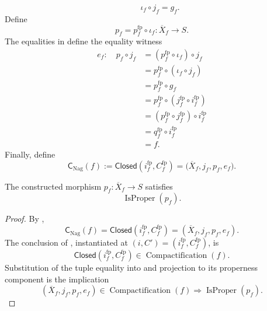 \begin{definition}
\[    \qquad
    \iota_f\circ j_f=g_f.
  \]
  Define
  \[
    p_f=p_f^{\mathrm{fp}}\circ\iota_f
      \colon\overline X_f\longrightarrow S.
  \]
  The equalities in
  define the equality witness
  \[
  \begin{aligned}
    e_f\colon\quad p_f\circ j_f
      &=(p_f^{\mathrm{fp}}\circ\iota_f)\circ j_f\\
      &=p_f^{\mathrm{fp}}\circ(\iota_f\circ j_f)\\
      &=p_f^{\mathrm{fp}}\circ g_f\\
      &=p_f^{\mathrm{fp}}\circ
        (j_f^{\mathrm{fp}}\circ i_f^{\mathrm{fp}})\\
      &=(p_f^{\mathrm{fp}}\circ j_f^{\mathrm{fp}})
        \circ i_f^{\mathrm{fp}}\\
      &=q_f^{\mathrm{fp}}\circ i_f^{\mathrm{fp}}\\
      &=f.
  \end{aligned}
  \]
  Finally, define
  \[
    \mathsf C_{\mathrm{Nag}}(f)
      :=\mathsf{Closed}(i_f^{\mathrm{fp}},C_f^{\mathrm{fp}})
      =\bigl(\overline X_f,j_f,p_f,e_f\bigr).
  \]
\end{definition}

\begin{lemma}
\checked
  \label{lemma:nagata-final-ambient-proper}
  \lean{}

  The constructed morphism $p_f\colon\overline X_f\to S$ satisfies
  \[
    \operatorname{IsProper}(p_f).
  \]
\end{lemma}

\begin{proof}
\checked
  By ,
  \[
    \mathsf C_{\mathrm{Nag}}(f)
      =\mathsf{Closed}(i_f^{\mathrm{fp}},C_f^{\mathrm{fp}})
      =(\overline X_f,j_f,p_f,e_f).
  \]
  The conclusion of
  , instantiated at
  $(i,C')=(i_f^{\mathrm{fp}},C_f^{\mathrm{fp}})$, is
  \[
    \mathsf{Closed}(i_f^{\mathrm{fp}},C_f^{\mathrm{fp}})
      \in\operatorname{Compactification}(f).
  \]
  Substitution of the tuple equality into
   and projection to its properness
  component is the implication
  \[
    (\overline X_f,j_f,p_f,e_f)
      \in\operatorname{Compactification}(f)
      \Longrightarrow\operatorname{IsProper}(p_f).
  \]
\end{proof}

